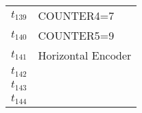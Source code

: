 \begin{table}[H]
\begin{tabular}{M{5cm}M{10cm}}
\hyperlink{partialNet:t1391}{\hypertarget{partialTable:t139}{$t_{139}$}} & COUNTER4=7\\
\hyperlink{partialNet:t1401}{\hypertarget{partialTable:t140}{$t_{140}$}} & COUNTER5=9\\
\hyperlink{partialNet:t1411}{\hypertarget{partialTable:t141}{$t_{141}$}} & Horizontal Encoder\\
\hyperlink{partialNet:t1421}{\hypertarget{partialTable:t142}{$t_{142}$}} & \\
\hyperlink{partialNet:t1431}{\hypertarget{partialTable:t143}{$t_{143}$}} & \\
\hyperlink{partialNet:t1441}{\hypertarget{partialTable:t144}{$t_{144}$}} & \\
\end{tabular}
\end{table}
